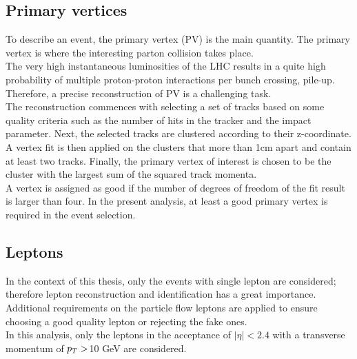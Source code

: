 \subsection{Primary vertices}
\label{sec:PV}
To describe an event, the primary vertex (PV) is the main quantity. The primary vertex is where the interesting parton collision takes place.\\
The very high instantaneous luminosities of the LHC results in a quite high probability of multiple proton-proton interactions per bunch crossing, pile-up. Therefore, a precise reconstruction of PV is a challenging task.\\
The reconstruction commences with selecting a set of tracks based on some quality criteria such as the number of hits in the tracker and the impact parameter. Next, the selected tracks are clustered according to their z-coordinate. A vertex fit \cite{VertFit} is then applied on the clusters that more than 1cm apart and contain at least two tracks. Finally, the primary vertex of interest is chosen to be the cluster with the largest sum of the squared track momenta.\\
A vertex is assigned as good if the number of degrees of freedom of the fit result is larger than four. In the present analysis, at least a good primary vertex is required in the event selection.
\subsection{Leptons}
In the context of this thesis, only the events with single lepton are considered; therefore lepton reconstruction and identification has a great importance. Additional requirements on the particle flow leptons are applied to ensure choosing a good quality lepton or rejecting the fake ones.\\
In this analysis, only the leptons in the acceptance of $|\eta|<2.4$ with a transverse momentum of $p_T>$10 GeV are considered.
